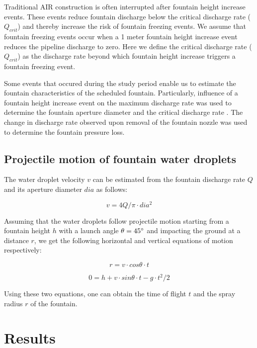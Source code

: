 \documentclass[tc, manuscript]{copernicus}
\begin{document}
Traditional AIR construction is often interrupted after fountain height increase events. These events reduce
fountain discharge below the critical discharge rate ($Q_{crit}$) and thereby increase the risk of fountain
freezing events. We assume that fountain freezing events occur when a 1 meter fountain height increase event
reduces the pipeline discharge to zero.  Here we define the critical discharge rate ($Q_{crit}$) as the
discharge rate beyond which fountain height increase triggers a fountain freezing event.

Some events that occured during the study period enable us to estimate the fountain characteristics of the
scheduled fountain. Particularly, influence of a fountain height increase event on the maximum discharge rate
was used to determine the fountain aperture diameter and the critical discharge rate  . The change in discharge
rate observed upon removal of the fountain nozzle was used to determine the fountain pressure loss.

\subsection{Projectile motion of fountain water droplets} \label{sec:proj}

The water droplet velocity $v$ can be estimated from the fountain discharge rate $Q$ and its aperture diameter
$dia$ as follows:

\begin{equation}
  v = 4Q/\pi \cdot dia^2
\end{equation}

Assuming that the water droplets follow projectile motion starting from a fountain height $h$ with a launch
angle $\theta = 45 ^{\circ}$ and impacting the ground at a distance $r$, we get the following horizontal and
vertical equations of motion respectively:

\begin{equation}
  \label{eqn:radf}
  r = v \cdot cos \theta \cdot t
\end{equation}

\begin{equation}
  0 = h + v \cdot sin \theta \cdot t - g\cdot t^2/2
\end{equation}

Using these two equations, one can obtain the time of flight $t$ and the spray radius $r$ of the fountain.

\section{Results}
\end{document}
